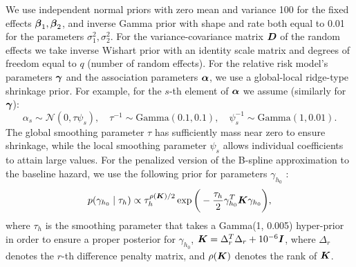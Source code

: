 We use independent normal priors with zero mean and variance 100 for the fixed effects $\boldsymbol{\beta}_1, \boldsymbol{\beta}_2$, and inverse Gamma prior with shape and rate both equal to 0.01 for the parameters $\sigma_1^2, \sigma_2^2$. For the variance-covariance matrix $\boldsymbol{D}$ of the random effects we take inverse Wishart prior with an identity scale matrix and degrees of freedom equal to $q$ (number of random effects). For the relative risk model's parameters $\boldsymbol{\gamma}$ and the association parameters $\boldsymbol{\alpha}$, we use a global-local ridge-type shrinkage prior. For example, for the $s$-{th} element of $\boldsymbol{\alpha}$ we assume (similarly for $\boldsymbol{\gamma}$):
\begin{equation*} 
\alpha_s \sim \mathcal{N}(0, \tau\psi_s), \quad \tau^{-1} \sim \mbox{Gamma}(0.1, 0.1),  \quad \psi_s^{-1} \sim \mbox{Gamma}(1, 0.01).
\end{equation*} 
The global smoothing parameter $\tau$ has sufficiently mass near zero to ensure shrinkage, while the local smoothing parameter $\psi_s$ allows individual coefficients to attain large values. For the penalized version of the B-spline approximation to the baseline hazard, we use the following prior for parameters $\gamma_{h_0}$ \citep{lang2004bayesian}:
\begin{equation*}
p(\gamma_{h_0} \mid \tau_h) \propto \tau_h^{\rho(\boldsymbol{K})/2} \exp\bigg(-\frac{\tau_h}{2}\gamma_{h_0}^T \boldsymbol{K} \gamma_{h_0}\bigg),
\end{equation*}
where $\tau_h$ is the smoothing parameter that takes a Gamma(1, 0.005) hyper-prior in order to ensure a proper posterior for $\gamma_{h_0}$, $\boldsymbol{K} = \Delta_r^T \Delta_r + 10^{-6} \boldsymbol{I}$, where $\Delta_r$ denotes the $r$-th difference penalty matrix, and $\rho(\boldsymbol{K})$ denotes the rank of $\boldsymbol{K}$.